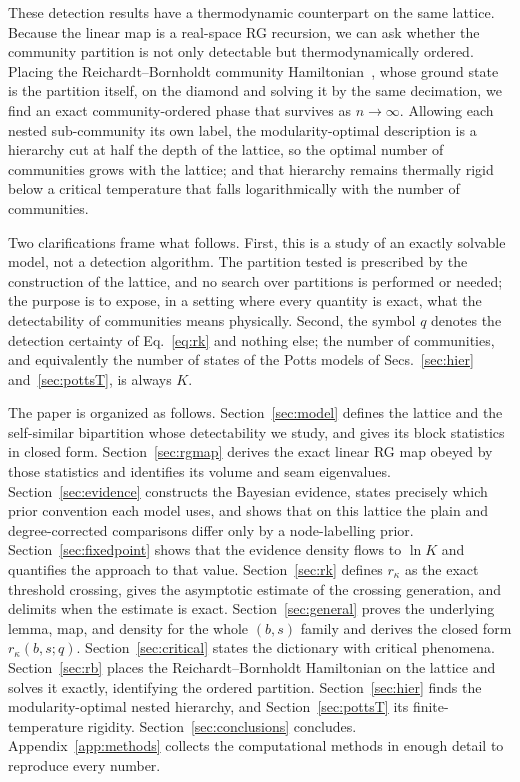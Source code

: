 \documentclass[preprint,12pt]{elsarticle}
\newcommand{\rk}{r_{\kappa}}
\begin{document}
These detection results have a thermodynamic counterpart on the same lattice.
Because the linear map is a real-space RG recursion, we can ask whether the
community partition is not only detectable but thermodynamically ordered.
Placing the Reichardt--Bornholdt community Hamiltonian~\cite{reichardt2004},
whose ground state is the partition itself, on the diamond and solving it by
the same decimation, we find an exact community-ordered phase that survives as
$n\to\infty$. Allowing each nested sub-community its own label, the
modularity-optimal description is a hierarchy cut at half the depth of the
lattice, so the optimal number of communities grows with the lattice; and that
hierarchy remains thermally rigid below a critical temperature that falls
logarithmically with the number of communities.

Two clarifications frame what follows. First, this is a study of an exactly
solvable model, not a detection algorithm. The partition tested is prescribed
by the construction of the lattice, and no search over partitions is performed
or needed; the purpose is to expose, in a setting where every quantity is
exact, what the detectability of communities means physically. Second, the
symbol $q$ denotes the detection certainty of Eq.~\eqref{eq:rk} and nothing
else; the number of communities, and equivalently the number of states of the
Potts models of Secs.~\ref{sec:hier} and~\ref{sec:pottsT}, is always $K$.

The paper is organized as follows. Section~\ref{sec:model} defines the lattice
and the self-similar bipartition whose detectability we study, and gives its
block statistics in closed form. Section~\ref{sec:rgmap} derives the exact
linear RG map obeyed by those statistics and identifies its volume and seam
eigenvalues. Section~\ref{sec:evidence} constructs the Bayesian evidence,
states precisely which prior convention each model uses, and shows that on this
lattice the plain and degree-corrected comparisons differ only by a
node-labelling prior. Section~\ref{sec:fixedpoint} shows that the evidence
density flows to $\ln K$ and quantifies the approach to that value.
Section~\ref{sec:rk} defines $\rk$ as the exact threshold crossing, gives the
asymptotic estimate of the crossing generation, and delimits when the estimate
is exact. Section~\ref{sec:general} proves the underlying lemma, map, and
density for the whole $(b,s)$ family and derives the closed form $\rk(b,s;q)$.
Section~\ref{sec:critical} states the dictionary with critical phenomena.
Section~\ref{sec:rb} places the Reichardt--Bornholdt Hamiltonian on the lattice
and solves it exactly, identifying the ordered partition.
Section~\ref{sec:hier} finds the modularity-optimal nested hierarchy, and
Section~\ref{sec:pottsT} its finite-temperature rigidity.
Section~\ref{sec:conclusions} concludes. Appendix~\ref{app:methods} collects
the computational methods in enough detail to reproduce every number.
\end{document}
